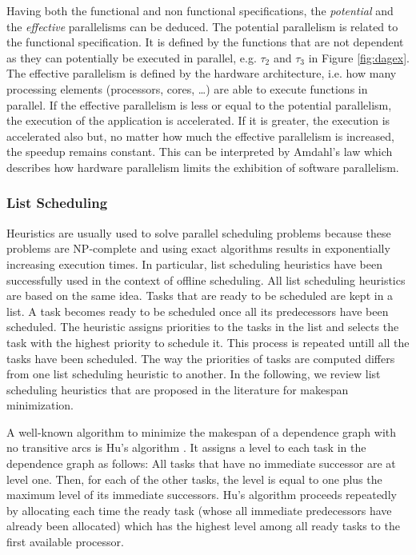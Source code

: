 Having both the functional and non functional specifications, the \textit{potential} and the \textit{effective} parallelisms can be deduced. The potential parallelism is related to the functional specification. It is defined by the functions that are not dependent as they can potentially be executed in parallel, e.g. $\tau_2$ and $\tau_3$ in Figure \ref{fig:dagex}. The effective parallelism is defined by the hardware architecture, i.e. how many processing elements (processors, cores, \ldots) are able to execute functions in parallel. If the effective parallelism is less or equal to the potential parallelism, the execution of the application is accelerated. If it is greater, the execution is accelerated also but, no matter how much the effective parallelism is increased, the speedup remains constant. This can be interpreted by Amdahl's law which describes how hardware parallelism limits the exhibition of software parallelism.


\subsubsection{List Scheduling}

Heuristics are usually used to solve parallel scheduling problems because these problems are NP-complete \cite{garey:2002} and using exact algorithms results in exponentially increasing execution times. In particular, list scheduling heuristics have been successfully used in the context of offline scheduling. All list scheduling heuristics are based on the same idea. Tasks that are ready to be scheduled are kept in a list. A task becomes ready to be scheduled once all its predecessors have been scheduled. The heuristic assigns priorities to the tasks in the list and selects the task with the highest priority to schedule it. This process is repeated untill all the tasks have been scheduled. The way the priorities of tasks are computed differs from one list scheduling heuristic to another. In the following, we review list scheduling heuristics that are proposed in the literature for makespan minimization.

A well-known algorithm to minimize the makespan of a dependence graph with no transitive arcs is Hu's algorithm \cite{hu:1961}. It assigns a level to each task in the dependence graph as follows: All tasks that have no immediate successor are at level one. Then, for each of the other tasks, the level is equal to one plus the maximum level of its immediate successors. Hu's algorithm proceeds repeatedly by allocating each time the ready task (whose all immediate predecessors have already been allocated) which has the highest level among all ready tasks to the first available processor. 

